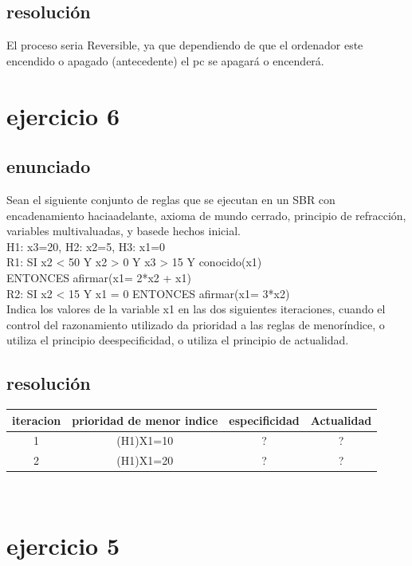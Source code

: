 \documentclass[a4paper,10pt]{article}
\newcommand\tab[1][1cm]{\hspace*{#1}}
\begin{document}
\subsection{resolución}
El proceso seria Reversible, ya que dependiendo de que el ordenador este encendido o apagado (antecedente) el pc se apagará o encenderá.

\section{ejercicio 6}
\subsection{enunciado}
Sean el siguiente conjunto de reglas que se ejecutan en un SBR con encadenamiento haciaadelante, axioma de mundo cerrado, principio de refracción, variables multivaluadas, y basede hechos inicial.\\
{H1: x3=20, H2: x2=5, H3: x1=0}\\
R1: SI x2 < 50 Y x2 > 0 Y x3 > 15 Y conocido(x1) \\
\tab ENTONCES afirmar(x1= 2*x2 + x1)\\
R2: SI x2 < 15 Y x1 = 0 ENTONCES afirmar(x1= 3*x2)\\
Indica los valores de la variable x1 en las dos siguientes iteraciones, cuando el control del razonamiento utilizado da prioridad a las reglas de menoríndice, o utiliza el principio deespecificidad, o utiliza el principio de actualidad.
\subsection{resolución}
\begin{tabular}{ c  c  c  c}
	iteracion & prioridad de menor indice & especificidad & Actualidad\\
	\hline
	1 & (H1)X1=10 & ? & ? \\
	2 & (H1)X1=20 & ? & ? \\
\end{tabular}\\
\pagebreak
\section{ejercicio 5}
\end{document}
